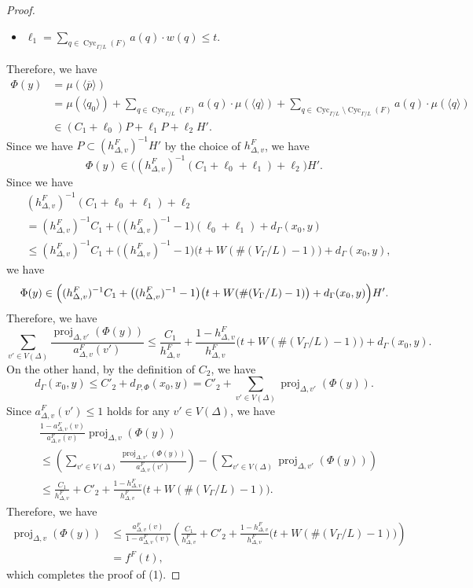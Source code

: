 \begin{proof}
\begin{itemize}
\item
$\ell _1 = 
\sum _{q \in \operatorname{Cyc}_{\Gamma /L}(F)} a(q) \cdot w(q) \le t$.
\end{itemize}
Therefore, we have
\begin{align*}
\Phi (y) &= \mu(\langle \overline{p} \rangle) \\
&= \mu(\langle q_0 \rangle)
+ \sum _{q \in \operatorname{Cyc}_{\Gamma /L}(F)} a(q) \cdot \mu(\langle q \rangle)+ 
\sum _{q \in \operatorname{Cyc}_{\Gamma /L} \setminus \operatorname{Cyc}_{\Gamma /L}(F)} a(q) \cdot \mu(\langle q \rangle) \\
&\in (C_1 + \ell _0)P + \ell _1 P + \ell _2 H'. 
\end{align*}
Since we have $P \subset (h^F _{\Delta, v})^{-1} H'$ by the choice of $h^F _{\Delta, v}$, we have
\[
\Phi (y) \in \bigl( (h^F _{\Delta, v})^{-1} ( C_1 + \ell _0 + \ell _1) + \ell _2 \bigr) H'. 
\]
Since we have
\begin{align*}
&(h^F _{\Delta, v})^{-1} ( C_1 + \ell _0 + \ell _1) + \ell _2 \\
&= (h^F _{\Delta, v})^{-1} C_1 + \bigl( (h^F _{\Delta, v})^{-1} - 1 \bigr) (\ell _0 + \ell _1) + d_{\Gamma}(x_0, y)\\
&\le (h^F _{\Delta, v})^{-1} C_1 + \bigl( (h^F _{\Delta, v})^{-1} - 1 \bigr) \bigl( t + W( \#(V_{\Gamma}/L) -1) \bigr) + d_{\Gamma}(x_0, y), 
\end{align*}
we have 
\[
\Phi (y) \in 
\Bigl( 
(h^F _{\Delta, v})^{-1} C_1 + \bigl( (h^F _{\Delta, v})^{-1} - 1 \bigr) 
\bigl( t + W(\#(V_{\Gamma}/L) -1) \bigr) + d_{\Gamma}(x_0, y)
\Bigr)H'. 
\]
Therefore, we have 
\[
\sum _{v' \in V(\Delta)} \frac{\operatorname{proj}_{\Delta, v'}(\Phi(y))}{a^F _{\Delta, v}(v')} \le 
\frac{C_1}{h^F _{\Delta, v}} + \frac{1 - h^F _{\Delta, v}}{h^F _{\Delta, v}} \bigl( t + W( \#(V_{\Gamma}/L) -1) \bigr) +  d_{\Gamma}(x_0, y). 
\]
On the other hand, by the definition of $C_2$, we have 
\[
d_{\Gamma}(x_0, y) \le C'_2 + d_{P, \Phi}(x_0, y) = 
C'_2 + \sum _{v' \in V(\Delta)} \operatorname{proj}_{\Delta, v'}(\Phi(y)). 
\]
Since $a^F _{\Delta, v}(v') \le 1$ holds for any $v' \in V(\Delta)$, we have
\begin{align*}
&\frac{1- a^F _{\Delta, v}(v)}{a^F _{\Delta, v}(v)} \operatorname{proj}_{\Delta, v}(\Phi(y)) \\
&\le
\left( \sum _{v' \in V(\Delta)} \frac{\operatorname{proj}_{\Delta, v'}(\Phi(y))}{a^F _{\Delta, v}(v')} \right) - 
\left( \sum _{v' \in V(\Delta)} \operatorname{proj}_{\Delta, v'}(\Phi(y)) \right) \\
&\le
\frac{C_1}{h^F _{\Delta, v}} + C'_2 + \frac{1 - h^F _{\Delta, v}}{h^F _{\Delta, v}} 
\bigl( t + W (\#(V_{\Gamma}/L) -1) \bigr). 
\end{align*}
Therefore, we have
\begin{align*}
\operatorname{proj}_{\Delta, v}(\Phi(y))
&\le \frac{a^F _{\Delta, v}(v)}{1- a^F _{\Delta, v}(v)}
	\left( \frac{C_1}{h^F _{\Delta, v}} + C'_2 + \frac{1 - h^F _{\Delta, v}}{h^F _{\Delta, v}} 
\bigl( t + W (\#(V_{\Gamma}/L) -1) \bigr) \right) \\
&= f^F(t), 
\end{align*}
which completes the proof of (1). 


\end{proof}
